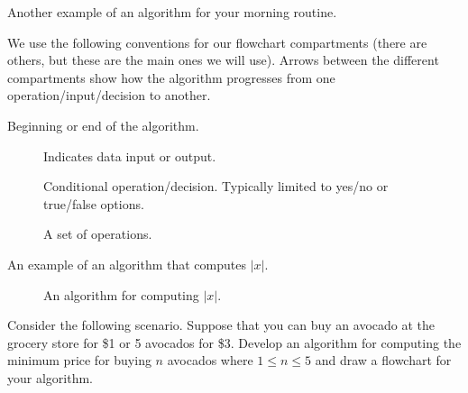 \documentclass{ximera}
\begin{document}
\begin{center}
	Another example of an algorithm for your morning routine.
\end{center}

We use the following conventions for our flowchart compartments (there are others, but these are the main ones we will use). Arrows between the different compartments show how the algorithm progresses from one operation/input/decision to another.

\begin{image}
\end{image}
\begin{center}
	Beginning or end of the algorithm.
\end{center}

\begin{figure}[!ht]
	\centering
	\caption{Indicates data input or output.}
\end{figure}

\begin{figure}[!ht]
	\centering
	\caption{Conditional operation/decision. Typically limited to yes/no or true/false options.}
\end{figure}

\begin{figure}[!ht]
	\centering
	\caption{A set of operations.}
\end{figure}

An example of an algorithm that computes $|x|$.

\begin{figure}[!ht]
	\centering
	\caption{An algorithm for computing $|x|$.}
\end{figure}

Consider the following scenario. Suppose that you can buy an avocado at the grocery store for \$1 or 5 avocados for \$3. Develop an algorithm for computing the minimum price for buying $n$ avocados where $1\leq n\leq 5$ and draw a flowchart for your algorithm.
\end{document}
